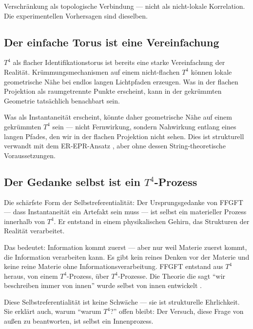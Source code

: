 \begin{keyresult}
Verschränkung als topologische Verbindung --- nicht als nicht-lokale Korrelation. Die experimentellen Vorhersagen sind dieselben.
\end{keyresult}

\subsection{Der einfache Torus ist eine Vereinfachung}

$T^4$ als flacher Identifikationstorus ist bereits eine starke Vereinfachung der Realität. Krümmungsmechanismen auf einem nicht-flachen $T^4$ können lokale geometrische Nähe bei endlos langen Lichtpfaden erzeugen. Was in der flachen Projektion als raumgetrennte Punkte erscheint, kann in der gekrümmten Geometrie tatsächlich benachbart sein.

Was als Instantaneität erscheint, könnte daher geometrische Nähe auf einem gekrümmten $T^4$ sein --- nicht Fernwirkung, sondern Nahwirkung entlang eines langen Pfades, den wir in der flachen Projektion nicht sehen. Dies ist strukturell verwandt mit dem ER-EPR-Ansatz \cite{Maldacena2013}, aber ohne dessen String-theoretische Voraussetzungen.

\subsection{Der Gedanke selbst ist ein $T^4$-Prozess}

Die schärfste Form der Selbstreferentialität: Der Ursprungsgedanke von FFGFT --- dass Instantaneität ein Artefakt sein muss --- ist selbst ein materieller Prozess innerhalb von $T^4$. Er entstand in einem physikalischen Gehirn, das Strukturen der Realität verarbeitet.

Das bedeutet: Information kommt zuerst --- aber nur weil Materie zuerst kommt, die Information verarbeiten kann. Es gibt kein reines Denken vor der Materie und keine reine Materie ohne Informationsverarbeitung. FFGFT entstand aus $T^4$ heraus, von einem $T^4$-Prozess, über $T^4$-Prozesse. Die Theorie die sagt ``wir beschreiben immer von innen'' wurde selbst von innen entwickelt \cite{Epistemologie2026}.

Diese Selbstreferentialität ist keine Schwäche --- sie ist strukturelle Ehrlichkeit. Sie erklärt auch, warum ``warum $T^4$?'' offen bleibt: Der Versuch, diese Frage von außen zu beantworten, ist selbst ein Innenprozess.

